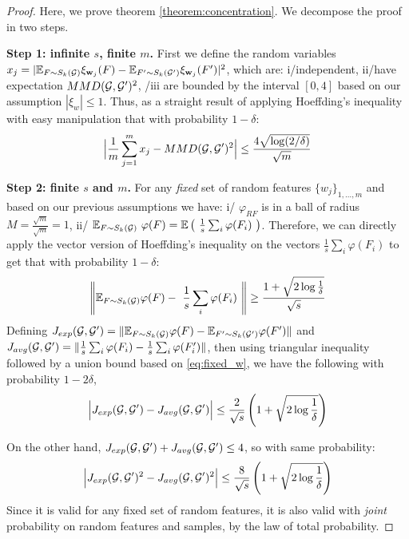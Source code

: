 \documentclass{article}
\begin{document}
\begin{proof}
Here, we prove theorem \ref{theorem:concentration}. We decompose the proof in two steps.

\textbf{Step 1: infinite $s$, finite $m$.} First we define the random variables $x_j=| \mathbb{E}_{F \sim S_k(\mathcal{G})} \xi_{\mathbf{w}_j}(F) - \mathbb{E}_{F' \sim S_k(\mathcal{G}')} \xi_{\mathbf{w}_j}(F') |^2$, which are: i/independent, ii/have expectation $MMD(\mathcal{G},\mathcal{G}')^2$, /iii are bounded by the interval $[0,4]$ based on our assumption $|\xi_w|\leq 1$. Thus, as a straight result of applying  Hoeffding's inequality with easy manipulation that with probability $1-\delta$:
\begin{equation}
\label{eq:step1}
\Big|\frac{1}{m} \sum_{j=1}^m x_j- MMD(\mathcal{G},\mathcal{G}')^2 \Big| \leq\\ \frac{4 \sqrt{\log (2/\delta)}}{\sqrt{m}}
\end{equation}

\textbf{Step 2: finite $s$ and $m$.} For any \emph{fixed} set of random features $\{w_j\}_{1,\ldots,m}$ and based on our previous assumptions we have: i/ $\varphi_{RF}$ is in a ball of radius $M=\frac{\sqrt{m}}{\sqrt{m}}=1$, ii/ $ \mathbb{E}_{F \sim S_k(\mathcal{G})}~ \varphi(F)= \mathbb{E}\left(~\frac{1}{{s}} \sum_i \varphi(F_i)~\right)$. Therefore, we can directly apply the vector version of Hoeffding's inequality on the vectors $\frac{1}{{s}} \sum_i \varphi(F_i)$ to get that with probability $1-\delta$:
\begin{equation}
    \label{eq:fixed_w}
    \left\|\mathbb{E}_{F \sim S_k(\mathcal{G})} \varphi(F)-~\frac{1}{s} \sum_i \varphi(F_i)~\right\|\geq \frac{1+\sqrt{2\log\frac{1}{\delta}}}{\sqrt{{s}}}
\end{equation}
Defining $J_{exp}(\mathcal{G},\mathcal{G}')=\| \mathbb{E}_{F \sim S_k(\mathcal{G})} \varphi(F) - \mathbb{E}_{F' \sim S_k(\mathcal{G}')} \varphi(F')\|$ and $J_{avg}(\mathcal{G},\mathcal{G}')=\| \frac{1}{{s}} \sum_i \varphi(F_i) - \frac{1}{{s}} \sum_i \varphi(F'_i)\|$, then using triangular inequality followed by a union bound based on \eqref{eq:fixed_w}, we have the following with probability $1-2\delta$,
\begin{align*}
    \Big | J_{exp}(\mathcal{G},\mathcal{G}') - J_{avg}(\mathcal{G},\mathcal{G}')\Big | \leq \frac{2}{\sqrt{{s}}}\left(1+\sqrt{2\log\frac{1}{\delta}}\right)
\end{align*}

On the other hand, $ J_{exp}(\mathcal{G},\mathcal{G}') + J_{avg}(\mathcal{G},\mathcal{G}')\leq 4$, so with same probability:
\begin{equation}\label{eq:step2}
    \Big | J_{exp}(\mathcal{G},\mathcal{G}')^2 - J_{avg}(\mathcal{G},\mathcal{G}')^2 \Big | \leq \frac{8}{\sqrt{{s}}}\left(1+\sqrt{2\log\frac{1}{\delta}}\right)
\end{equation}
Since it is valid for any fixed set of random features, it is also valid with \emph{joint} probability on random features and samples, by the law of total probability.


\end{proof}
\end{document}
